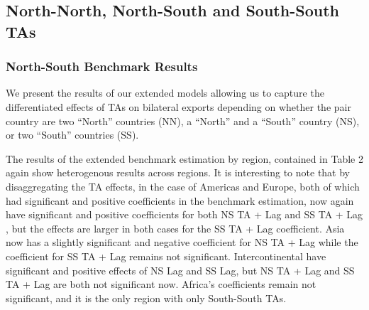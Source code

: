%
\FloatBarrier

%
\subsection{North{-}North, North{-}South and South{-}South TAs}%
\label{subsec:North{-}North,North{-}SouthandSouth{-}SouthTAs}%
\subsubsection{North{-}South Benchmark Results}%
\label{ssubsec:North{-}SouthBenchmarkResults}%
We present the results of our extended models allowing us to capture the
differentiated effects of TAs on bilateral exports depending on whether
the pair country are two ``North'' countries (NN), a ``North'' and a
``South'' country (NS), or two ``South'' countries (SS).

The results of the extended benchmark estimation by region, contained in
Table 2 again show heterogenous results across regions. It is
interesting to note that by disaggregating the TA effects, in the case
of Americas and Europe, both of which had significant and positive
coefficients in the benchmark estimation, now again have significant and
positive coefficients for both NS TA + Lag and SS TA + Lag , but the
effects are larger in both cases for the SS TA + Lag coefficient. Asia
now has a slightly significant and negative coefficient for NS TA + Lag
while the coefficient for SS TA + Lag remains not significant.
Intercontinental have significant and positive effects of NS Lag and SS
Lag, but NS TA + Lag and SS TA + Lag are both not significant now.
Africa's coefficients remain not significant, and it is the only region
with only South-South TAs.
%
%
\FloatBarrier

%
